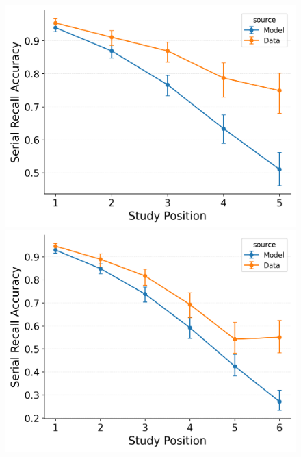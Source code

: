 \documentclass[
  man,
  floatsintext,
  longtable,
  nolmodern,
  notxfonts,
  notimes,
  draftfirst,
  colorlinks=true,linkcolor=blue,citecolor=blue,urlcolor=blue]{apa7}
\begin{document}
\begin{figure}
\begin{minipage}{0.33\linewidth}
\includegraphics{figures/Gordon2021_BaseCMR_Confusable_Fitting_srac_LL5.png}\end{minipage}%
%
\begin{minipage}{0.33\linewidth}
\includegraphics{figures/Gordon2021_BaseCMR_Confusable_Fitting_srac_LL6.png}\end{minipage}%
%
\begin{minipage}{0.33\linewidth}

\end{minipage}
\end{figure}
\end{document}
